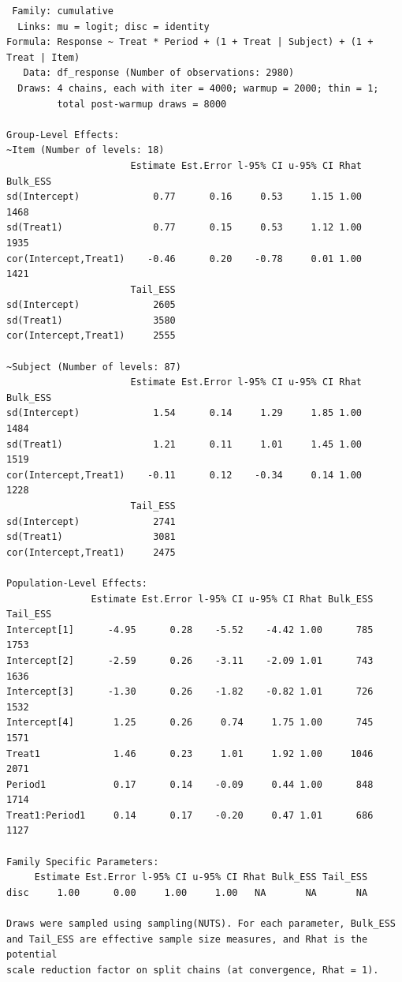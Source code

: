 \documentclass[
  12pt,
  a4paper,
  extrafontsizes,
  onecolumn,
  openright,
  table]{memoir}
\begin{document}
\begin{verbatim}
 Family: cumulative 
  Links: mu = logit; disc = identity 
Formula: Response ~ Treat * Period + (1 + Treat | Subject) + (1 + Treat | Item) 
   Data: df_response (Number of observations: 2980) 
  Draws: 4 chains, each with iter = 4000; warmup = 2000; thin = 1;
         total post-warmup draws = 8000

Group-Level Effects: 
~Item (Number of levels: 18) 
                      Estimate Est.Error l-95% CI u-95% CI Rhat Bulk_ESS
sd(Intercept)             0.77      0.16     0.53     1.15 1.00     1468
sd(Treat1)                0.77      0.15     0.53     1.12 1.00     1935
cor(Intercept,Treat1)    -0.46      0.20    -0.78     0.01 1.00     1421
                      Tail_ESS
sd(Intercept)             2605
sd(Treat1)                3580
cor(Intercept,Treat1)     2555

~Subject (Number of levels: 87) 
                      Estimate Est.Error l-95% CI u-95% CI Rhat Bulk_ESS
sd(Intercept)             1.54      0.14     1.29     1.85 1.00     1484
sd(Treat1)                1.21      0.11     1.01     1.45 1.00     1519
cor(Intercept,Treat1)    -0.11      0.12    -0.34     0.14 1.00     1228
                      Tail_ESS
sd(Intercept)             2741
sd(Treat1)                3081
cor(Intercept,Treat1)     2475

Population-Level Effects: 
               Estimate Est.Error l-95% CI u-95% CI Rhat Bulk_ESS Tail_ESS
Intercept[1]      -4.95      0.28    -5.52    -4.42 1.00      785     1753
Intercept[2]      -2.59      0.26    -3.11    -2.09 1.01      743     1636
Intercept[3]      -1.30      0.26    -1.82    -0.82 1.01      726     1532
Intercept[4]       1.25      0.26     0.74     1.75 1.00      745     1571
Treat1             1.46      0.23     1.01     1.92 1.00     1046     2071
Period1            0.17      0.14    -0.09     0.44 1.00      848     1714
Treat1:Period1     0.14      0.17    -0.20     0.47 1.01      686     1127

Family Specific Parameters: 
     Estimate Est.Error l-95% CI u-95% CI Rhat Bulk_ESS Tail_ESS
disc     1.00      0.00     1.00     1.00   NA       NA       NA

Draws were sampled using sampling(NUTS). For each parameter, Bulk_ESS
and Tail_ESS are effective sample size measures, and Rhat is the potential
scale reduction factor on split chains (at convergence, Rhat = 1).
\end{verbatim}

\normalsize
\end{document}
